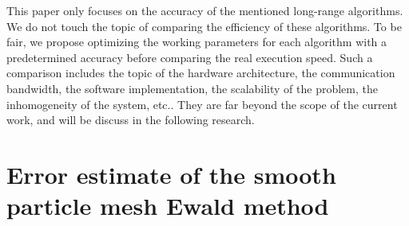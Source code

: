 \documentclass[aps,pre,preprint,unsortedaddress]{revtex4}
\begin{document}
This paper only focuses on the accuracy of the
mentioned long-range algorithms.
We do not touch the topic of comparing the efficiency of these algorithms.
To be fair,
we propose 
optimizing the working parameters for each algorithm with a
predetermined accuracy before
comparing
the real execution speed.
Such a comparison includes the topic of the hardware architecture,
the communication bandwidth,
the software implementation, the scalability of the problem,
the inhomogeneity of the system, etc..
They are far beyond the scope of the current
work, and will be discuss in the following research.




\appendix
\section{Error estimate of the smooth particle mesh
Ewald method}
\label{sec:appendix}
\end{document}
